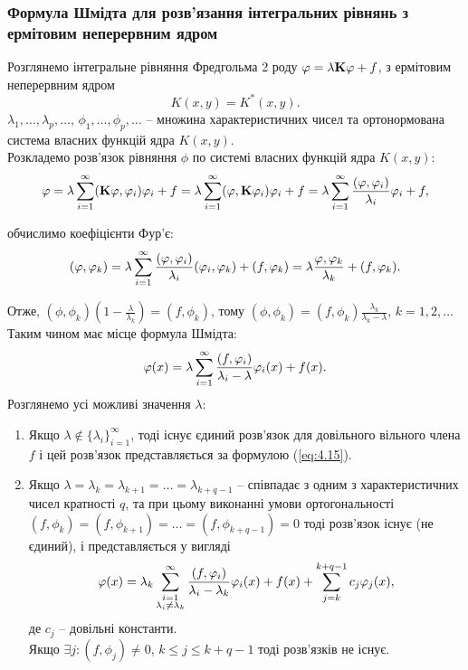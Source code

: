 \subsubsection*{Формула Шмідта для розв’язання інтегральних рівнянь з ермітовим неперервним ядром}

Розглянемо інтегральне рівняння Фредгольма 2 роду $\phi = \lambda \bf{K} \phi + f$, з ермітовим неперервним ядром 
\begin{equation} 
	\label{eq:4.14} 
	K(x, y) = K^* (x, y).
\end{equation}
$\lambda_1, \ldots, \lambda_p, \ldots$, $\phi_1, \ldots, \phi_p, \ldots$ -- множина характеристичних чисел та ортонормована система власних функцій ядра $K(x, y)$. \\

Розкладемо розв’язок рівняння $\phi$ по системі власних функцій ядра $K(x, y)$:
\[ \phi = \lambda \Sum_{i = 1}^\infty (\bf{K}\phi, \phi_i) \phi_i + f = \lambda \Sum_{i = 1}^\infty (\phi, \bf{K} \phi_i) \phi_i + f = \lambda \Sum_{i = 1}^\infty \dfrac{(\phi, \phi_i)}{\lambda_i} \phi_i + f, \]

обчислимо коефіцієнти Фур'є: \[ (\phi, \phi_k) = \lambda \Sum_{i = 1}^\infty \dfrac{(\phi, \phi_i)}{\lambda_i} (\phi_i, \phi_k) + (f, \phi_k) = \lambda \dfrac{\phi, \phi_k}{\lambda_k} + (f, \phi_k). \]

Отже, $(\phi, \phi_k) \left(1 - \frac{\lambda}{\lambda_k}\right) = (f, \phi_k)$, тому $(\phi, \phi_k) = (f, \phi_k) \frac{\lambda_k}{\lambda_k - \lambda}$, $k = 1, 2, \ldots$ \\

Таким чином має місце формула Шмідта:
\begin{equation}
	\label{eq:4.15}
	\phi(x) = \lambda \Sum_{i = 1}^\infty \dfrac{(f, \phi_i)}{\lambda_i - \lambda} \phi_i(x) + f(x).
\end{equation}
Розглянемо усі можливі значення $\lambda$:
\begin{enumerate}
	\item Якщо $\lambda \notin \{\lambda_i\}_{i=1}^\infty$, тоді існує єдиний розв'язок для довільного вільного члена $f$ і цей розв'язок представляється за формулою (\ref{eq:4.15}).
	\item Якщо $\lambda = \lambda_k = \lambda_{k + 1} = \ldots = \lambda_{k + q - 1}$ -- співпадає з одним з характеристичних чисел кратності $q$, та при цьому виконанні умови ортогональності $(f, \phi_k) = (f, \phi_{k + 1}) = \ldots = (f, \phi_{k + q - 1}) = 0$ тоді розв'язок існує (не єдиний), і представляється у вигляді 
	\begin{equation}
		\label{eq:4.16}
		\phi(x) = \lambda_k \Sum_{\substack{i = 1 \\ \lambda_i \ne \lambda_k}}^\infty \dfrac{(f, \phi_i)}{\lambda_i - \lambda_k} \phi_i(x) + f(x) + \Sum_{j = k}^{k + q - 1} c_j \phi_j(x),
	\end{equation}
	де $c_j$ -- довільні константи. \\

	Якщо $\exists j: (f, \phi_j) \ne 0$, $k \le j \le k + q - 1$ тоді розв'язків не існує.
\end{enumerate}

